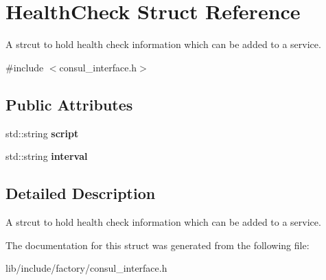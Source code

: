 \hypertarget{structHealthCheck}{\section{Health\-Check Struct Reference}
\label{structHealthCheck}
}


A strcut to hold health check information which can be added to a service.  




{\ttfamily \#include $<$consul\-\_\-interface.\-h$>$}

\subsection*{Public Attributes}
\begin{DoxyCompactItemize}
\item 
\hypertarget{structHealthCheck_af2cf9613abcc567941f8a21cd8c15bff}{std\-::string {\bfseries script}}\label{structHealthCheck_af2cf9613abcc567941f8a21cd8c15bff}

\item 
\hypertarget{structHealthCheck_af8e93405495e1733ba69a7e3f73a139a}{std\-::string {\bfseries interval}}\label{structHealthCheck_af8e93405495e1733ba69a7e3f73a139a}

\end{DoxyCompactItemize}


\subsection{Detailed Description}
A strcut to hold health check information which can be added to a service. 

The documentation for this struct was generated from the following file\-:\begin{DoxyCompactItemize}
\item 
lib/include/factory/consul\-\_\-interface.\-h\end{DoxyCompactItemize}
